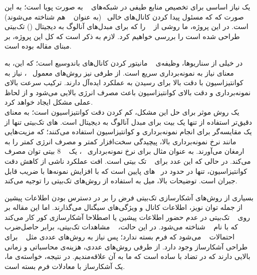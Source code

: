 

 یک نیاز اساسی برای تخصیص منابع طیفی در شبکه‌های \  به صورت پویا است؛ 
به این صورت که که مسئول پیدا کردن کانال‌های خالی \ (به عنوان \  هم شناخته می‌شوند)
است.
در این پروژه، ما روشی از \ 
را که برای مبدل‌های آنالوگ به دیجیتال () تک‌بیتی طراحی شده است را بررسی خواهیم کرد.
لازم به ذکر است که کل این پروژه، بر مبنای مقاله  بوده است.


در خیلی از سناریوها، وظیفه‌ی \  مانیتور کردن کانال‌های باندوسیع است؛
که این، به معنای نیاز به نمونه‌برداری سریع است. از طرفی نیز روش‌های معمول \ ،
نیاز به کوانتیزاسیون با دقت بالا برای رسیدن به عملکرد ایده‌آل دارند.
ترکیب سرعت بالای نمونه‌برداری و دقت بالای کوانتیزاسیون باعث مصرف انرژی بالایی می‌شود
و از لحاظ عملی مشکل ایجاد خواهد کرد. \\
یک روش موثر برای حل این مشکل، کم کردن دقت کوانتیزاسیون است؛ به معنای دقیق‌تر
استفاده از تنها یک بیت برای مبدل آنالوگ به دیجیتال است.
های تک‌بیتی تنها از یک مقایسه‌گر برای انجام نمونه‌برداری و کوانتیزاسیون استفاده می‌کنند؛ که
مزیت‌هایی مانند نرخ نمونه‌برداری بالا، پیچیدگی سخت‌افزار کمتر و مصرف انرژی کمتر را به ارمغان می‌آورند.
به عنوان مثال برای نرخ نمونه‌برداری \ ، یک \  8 بیتی 
توان مصرف می‌کند. در حالی که این عدد برای \  تک بیتی
است.
افت عملکرد ناشی از کاهش دقت کوانتیزاسیون، تنها در حدود 
در \ های پایین است که با افزایش نمونه‌ها با ضریب 
 قابل جبران است.
توضیحات بالا، میل به استفاده از روش‌های تک‌بیتی را توجیه می‌کند.


بسیاری از روش‌های آشکارسازی تک‌بیتی فرض را بر در دسترس بودن اطلاعات پیشین از جمله توان نویز،
اطلاعات کانال و ویژگی‌های سیگنال می‌گذارند.
اما این مقاله بر روی \  تک‌بیتی در عدم حضور اطلاعات پیشین
یا اصطلاحا آشکارسازی کور کار می‌کند که با نام \  شناخته می‌شود. در این حالت، \  مشاهدات تک‌بیتی، برابر حاصل‌ضرب احتمالات \  می‌شود که فرم بسته ندارد؛ پس نیاز به روش‌های عددی مثل \  برای طراحی آشکارساز وجود دارد. از طرفی روش‌های عددی، هزینه‌ی محاسباتی و زمانی بالایی دارند که در تضاد با  ساده است که ما به آن علاقه‌مندیم. در نتیجه، خواسته‌ی ما، یک آشکارساز با معادلات فرم بسته است.


